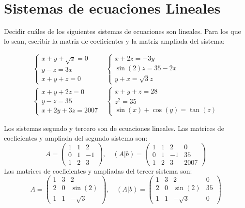 \section{Sistemas de ecuaciones Lineales}
\begin{ejercicio}Decidir cuáles de los siguientes sistemas de ecuaciones son lineales. Para los que lo sean, escribir la matriz de coeficientes y la matriz ampliada del sistema:

	\begin{align*}
		\begin{cases}
			x + y + \sqrt{z} = 0 \\
			y - z = 3x           \\
			x + y + z = 0
		\end{cases} & \begin{cases}
			              x + 2z = -3y       \\
			              \sin(2)z = 35 - 2x \\
			              y + x = \sqrt{3}z
		              \end{cases}              \\
		\begin{cases}
			x + y + 2z = 0 \\
			y - z = 35     \\
			x + 2y + 3z = 2007
		\end{cases}      & \begin{cases}
			                   x + y + z = 28 \\
			                   z^2 = 35       \\
			                   \sin(x) + \cos(y) = \tan(z)
		                   \end{cases}
	\end{align*}


	Los sistemas segundo y tercero son de ecuaciones lineales. Las matrices de coeficientes y ampliada del segundo sistema son:
	\[
		A = \begin{pmatrix}
			1 & 1 & 2  \\
			0 & 1 & -1 \\
			1 & 2 & 3
		\end{pmatrix}, \quad (A|b) = \left(\begin{array}{ccc|c}
				1 & 1 & 2  & 0    \\
				0 & 1 & -1 & 35   \\
				1 & 2 & 3  & 2007
			\end{array}\right)
	\]
	Las matrices de coeficientes y ampliadas del tercer sistema son:
	\[
		A = \begin{pmatrix}
			1 & 3 & 2         \\
			2 & 0 & \sin(2)   \\
			1 & 1 & -\sqrt{3}
		\end{pmatrix}, \quad (A|b) = \left(\begin{array}{ccc|c}
				1 & 3 & 2         & 0  \\
				2 & 0 & \sin(2)   & 35 \\
				1 & 1 & -\sqrt{3} & 0
			\end{array}\right)
	\]
\end{ejercicio}

